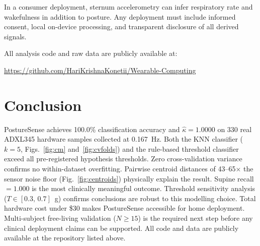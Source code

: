\documentclass[journal]{IEEEtran}
\begin{document}
In a consumer deployment, sternum accelerometry can infer respiratory rate
and wakefulness in addition to posture. Any deployment must include
informed consent, local on-device processing, and transparent disclosure
of all derived signals.

All analysis code and raw data are publicly available at:
\begin{center}
\url{https://github.com/HariKrishnaKonetii/Wearable-Computing}
\end{center}

\section{Conclusion}

PostureSense achieves 100.0\% classification accuracy and
$\hat{\kappa}=1.0000$ on 330 real ADXL345 hardware samples collected at
0.167~Hz. Both the KNN classifier ($k=5$, Figs.~\ref{fig:cm}
and~\ref{fig:cvfolds}) and the rule-based threshold classifier exceed all
pre-registered hypothesis thresholds. Zero cross-validation variance confirms
no within-dataset overfitting. Pairwise centroid distances of 43--65$\times$
the sensor noise floor (Fig.~\ref{fig:centroids}) physically explain the
result. Supine recall~$=1.000$ is the most clinically meaningful outcome.
Threshold sensitivity analysis ($T\in[0.3,\,0.7]$~g) confirms conclusions
are robust to this modelling choice. Total hardware cost under \$30 makes
PostureSense accessible for home deployment. Multi-subject free-living
validation ($N\geq15$) is the required next step before any clinical
deployment claims can be supported. All code and data are publicly available
at the repository listed above.
\end{document}

